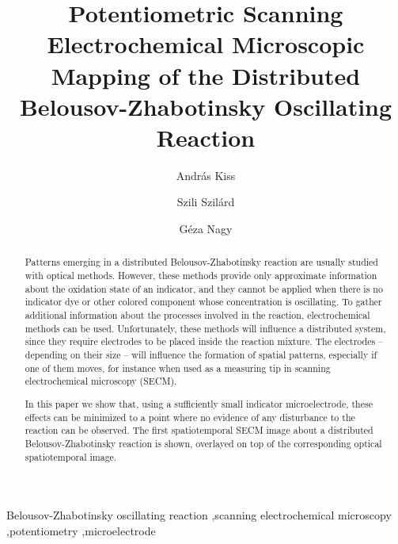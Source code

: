 \documentclass[3p, twocolumn]{elsarticle}
\begin{document}
\begin{frontmatter}

\title{Potentiometric Scanning Electrochemical Microscopic Mapping of the Distributed Belousov-Zhabotinsky Oscillating Reaction}
\author[akiss]{András Kiss}
\author[szszilard]{Szili Szilárd}
\address[akiss, gnagy, szszilard]{Department of General and Physical Chemistry, Faculty of Sciences, University of Pécs, 7624 Pécs, Ifjúság útja 6, Hungary}
\author[gnagy]{Géza Nagy}


\begin{abstract}

Patterns emerging in a distributed Belousov-Zhabotinsky reaction are usually studied with optical methods.
However, these methods provide only approximate information about the oxidation state of an indicator, and they cannot be applied when there is no indicator dye or other colored component whose concentration is oscillating.
To gather additional information about the processes involved in the reaction, electrochemical methods can be used.
Unfortunately, these methods will influence a distributed system, since they require electrodes to be placed inside the reaction mixture.
The electrodes -- depending on their size -- will influence the formation of spatial patterns, especially if one of them moves, for instance when used as a measuring tip in scanning electrochemical microscopy (SECM).

In this paper we show that, using a sufficiently small indicator microelectrode, these effects can be minimized to a point where no evidence of any disturbance to the reaction can be observed.
The first spatiotemporal SECM image about a distributed Belousov-Zhabotinsky reaction is shown, overlayed on top of the corresponding optical spatiotemporal image.

\end{abstract}
\begin{keyword}
	Belousov-Zhabotinsky oscillating reaction \sep scanning electrochemical microscopy \sep potentiometry \sep microelectrode
\end{keyword}
\end{frontmatter}
\end{document}
